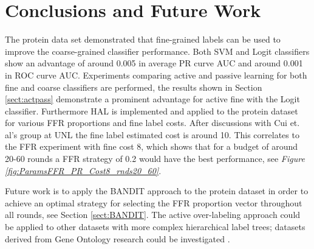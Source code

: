 \documentclass[ms]{nuthesis}
\begin{document}



\chapter{Conclusions and Future Work}
\par The protein data set demonstrated that fine-grained labels can be used
to improve the coarse-grained classifier performance. Both SVM and Logit
classifiers show an advantage of around 0.005 in average PR curve AUC and around
0.001 in ROC curve AUC. Experiments comparing active and passive learning for both
fine and coarse classifiers are performed, the results shown in Section \ref{sect:actpass}
demonstrate a prominent advantage for active fine with the Logit classifier. Furthermore
 HAL is implemented and applied to the protein dataset for various FFR proportions and
 fine label costs. After discussions with Cui et. al's group at UNL \cite{bioPoster} the fine label
 estimated cost is around 10. This correlates to the FFR experiment with fine cost 8, which shows
 that for a budget of around 20-60 rounds a FFR strategy of 0.2 would have the best performance,
 see \textit{Figure \ref{fig:ParamsFFR_PR_Cost8_rnds20_60}}.
 \par Future work is to apply the BANDIT approach to the protein dataset in order to achieve
 an optimal strategy for selecting the FFR proportion vector throughout all rounds, see
 Section \ref{sect:BANDIT}. The active over-labeling approach could be applied to other
 datasets with more complex hierarchical label trees; datasets derived from
 Gene Ontology research could be investigated \cite{GeneOntology}.



\backmatter

%

%


\nocite{*}


\end{document}
